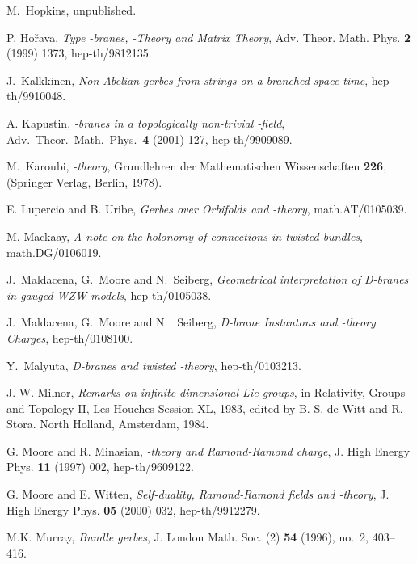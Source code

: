 \documentclass[a4paper,reqno]{amsart}
\theoremstyle{plain}
\theoremstyle{definition}
\theoremstyle{remark}
\numberwithin{equation}{section}
\numberwithin{figure}{section}
\providecommand{\<}{\langle}
\renewcommand{\>}{\rangle}
\begin{document}
\begin{thebibliography}{99}
M.~Hopkins, unpublished.

P. Ho\v rava, {\it Type \coordHE{}  \coordHE{}-branes, \coordHE{}-Theory and Matrix Theory},
Adv. Theor. Math. Phys. {\bf 2} (1999) 1373, hep-th/9812135.

J.~Kalkkinen, {\it Non-Abelian gerbes from strings on a branched
space-time}, hep-th/9910048.

A. Kapustin,
{\it {}\coordHE{}-branes in a topologically non-trivial \coordHE{}-field},
Adv.\ Theor.\ Math.\ Phys.\ {\bf 4} (2001) 127, hep-th/9909089.

M.~Karoubi, {\it {}\coordHE{}-theory}, Grundlehren der Mathematischen
Wissenschaften {\bf 226}, (Springer Verlag, Berlin, 1978).

E. Lupercio and B. Uribe,
{\it Gerbes over Orbifolds and \coordHE{}-theory},
math.AT/0105039.

M. Mackaay,
{\it A note on the holonomy of connections in twisted bundles},
math.DG/0106019.

J.~Maldacena, G.~Moore and N.~Seiberg, {\it Geometrical
interpretation of D-branes in gauged WZW models}, hep-th/0105038.

J.~Maldacena, G.~Moore and N. ~Seiberg, {\it D-brane Instantons 
and \coordHE{}-theory Charges}, hep-th/0108100. 

Y.~Malyuta, {\it D-branes and twisted \coordHE{}-theory}, hep-th/0103213.

J. W. Milnor, {\it Remarks on infinite dimensional Lie groups}, 
in Relativity, Groups and Topology II, Les Houches Session XL, 
1983, edited by B. S. de Witt and R. Stora.  North Holland, 
Amsterdam, 1984. 

G. Moore and R. Minasian,
{\it {}\coordHE{}-theory and Ramond-Ramond charge},
J. High Energy Phys. {\bf 11} (1997) 002, hep-th/9609122.

G. Moore and E. Witten,
{\it Self-duality, Ramond-Ramond fields and \coordHE{}-theory},
J. High Energy Phys. {\bf 05} (2000) 032,
hep-th/9912279.

M.K. Murray, {\it Bundle gerbes},
J. London Math. Soc. (2) {\bf 54}
(1996), no.~2, 403--416.


\end{thebibliography}
\end{document}
